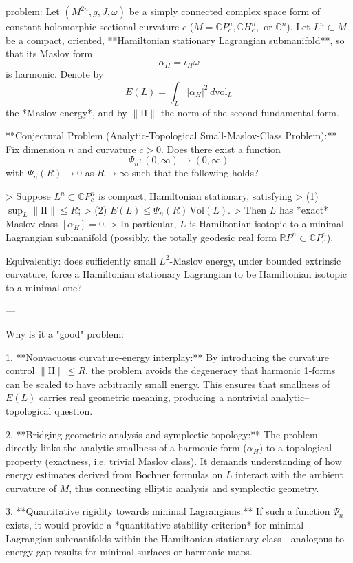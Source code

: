 problem:  
Let \( (M^{2n}, g, J, \omega) \) be a simply connected complex space form of constant holomorphic sectional curvature \(c\) (\(M=\mathbb{C}P^n_c, \mathbb{C}H^n_c,\) or \(\mathbb{C}^n\)).  
Let \(L^n \subset M\) be a compact, oriented, **Hamiltonian stationary Lagrangian submanifold**, so that its Maslov form  
\[
\alpha_H = \iota_H \omega
\]
is harmonic. Denote by 
\[
E(L) = \int_L |\alpha_H|^2 \, d\mathrm{vol}_L
\]
the *Maslov energy*, and by \(\|\mathrm{II}\|\) the norm of the second fundamental form.

**Conjectural Problem (Analytic-Topological Small-Maslov-Class Problem):**  
Fix dimension \(n\) and curvature \(c>0\). Does there exist a function  
\[
\Psi_n:(0,\infty)\to(0,\infty)
\]
with \(\Psi_n(R)\to0\) as \(R\to\infty\) such that the following holds?

> Suppose \(L^n\subset \mathbb{C}P^n_c\) is compact, Hamiltonian stationary, satisfying  
> (1) \(\sup_L \|\mathrm{II}\| \le R\);   
> (2) \(E(L) \le \Psi_n(R)\,\mathrm{Vol}(L)\).  
> Then \(L\) has *exact* Maslov class \( [\alpha_H] = 0 \).  
> In particular, \(L\) is Hamiltonian isotopic to a minimal Lagrangian submanifold (possibly, the totally geodesic real form \( \mathbb{R}P^n \subset \mathbb{C}P^n_c \)).

Equivalently: does sufficiently small \(L^2\)-Maslov energy, under bounded extrinsic curvature, force a Hamiltonian stationary Lagrangian to be Hamiltonian isotopic to a minimal one?

---

Why is it a "good" problem:  

1. **Nonvacuous curvature-energy interplay:**  
   By introducing the curvature control \(\|\mathrm{II}\|\le R\), the problem avoids the degeneracy that harmonic 1‑forms can be scaled to have arbitrarily small energy. This ensures that smallness of \(E(L)\) carries real geometric meaning, producing a nontrivial analytic–topological question.

2. **Bridging geometric analysis and symplectic topology:**  
   The problem directly links the analytic smallness of a harmonic form (\(\alpha_H\)) to a topological property (exactness, i.e. trivial Maslov class). It demands understanding of how energy estimates derived from Bochner formulas on \(L\) interact with the ambient curvature of \(M\), thus connecting elliptic analysis and symplectic geometry.

3. **Quantitative rigidity towards minimal Lagrangians:**  
   If such a function \(\Psi_n\) exists, it would provide a *quantitative stability criterion* for minimal Lagrangian submanifolds within the Hamiltonian stationary class—analogous to energy gap results for minimal surfaces or harmonic maps.

